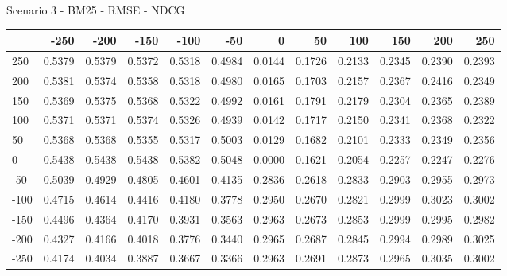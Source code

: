 Scenario 3 - BM25 - RMSE - NDCG
\begin{tabular}{lrrrrrrrrrrr}
\toprule
{} &   -250 &   -200 &   -150 &   -100 &   -50  &    0   &    50  &    100 &    150 &    200 &    250 \\
\midrule
 250 & 0.5379 & 0.5379 & 0.5372 & 0.5318 & 0.4984 & 0.0144 & 0.1726 & 0.2133 & 0.2345 & 0.2390 & 0.2393 \\
 200 & 0.5381 & 0.5374 & 0.5358 & 0.5318 & 0.4980 & 0.0165 & 0.1703 & 0.2157 & 0.2367 & 0.2416 & 0.2349 \\
 150 & 0.5369 & 0.5375 & 0.5368 & 0.5322 & 0.4992 & 0.0161 & 0.1791 & 0.2179 & 0.2304 & 0.2365 & 0.2389 \\
 100 & 0.5371 & 0.5371 & 0.5374 & 0.5326 & 0.4939 & 0.0142 & 0.1717 & 0.2150 & 0.2341 & 0.2368 & 0.2322 \\
 50  & 0.5368 & 0.5368 & 0.5355 & 0.5317 & 0.5003 & 0.0129 & 0.1682 & 0.2101 & 0.2333 & 0.2349 & 0.2356 \\
 0   & 0.5438 & 0.5438 & 0.5438 & 0.5382 & 0.5048 & 0.0000 & 0.1621 & 0.2054 & 0.2257 & 0.2247 & 0.2276 \\
-50  & 0.5039 & 0.4929 & 0.4805 & 0.4601 & 0.4135 & 0.2836 & 0.2618 & 0.2833 & 0.2903 & 0.2955 & 0.2973 \\
-100 & 0.4715 & 0.4614 & 0.4416 & 0.4180 & 0.3778 & 0.2950 & 0.2670 & 0.2821 & 0.2999 & 0.3023 & 0.3002 \\
-150 & 0.4496 & 0.4364 & 0.4170 & 0.3931 & 0.3563 & 0.2963 & 0.2673 & 0.2853 & 0.2999 & 0.2995 & 0.2982 \\
-200 & 0.4327 & 0.4166 & 0.4018 & 0.3776 & 0.3440 & 0.2965 & 0.2687 & 0.2845 & 0.2994 & 0.2989 & 0.3025 \\
-250 & 0.4174 & 0.4034 & 0.3887 & 0.3667 & 0.3366 & 0.2963 & 0.2691 & 0.2873 & 0.2965 & 0.3035 & 0.3002 \\
\bottomrule
\end{tabular}

